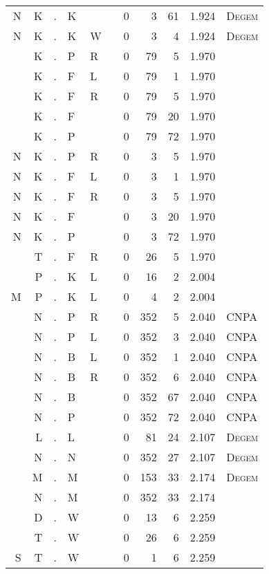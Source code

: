 \begin{longtable}{r@{ } r@{ } c@{ } l@{ } l@{ } l@{ } r r r r l }
N & K & . & K &   &   & 0 & 3 & 61 & 1.924 & \textsc{Degem} \\
N & K & . & K & W &   & 0 & 3 & 4 & 1.924 & \textsc{Degem} \\
  & K & . & P & R &   & 0 & 79 & 5 & 1.970 &  \\
  & K & . & F & L &   & 0 & 79 & 1 & 1.970 &  \\
  & K & . & F & R &   & 0 & 79 & 5 & 1.970 &  \\
  & K & . & F &   &   & 0 & 79 & 20 & 1.970 &  \\
  & K & . & P &   &   & 0 & 79 & 72 & 1.970 &  \\
N & K & . & P & R &   & 0 & 3 & 5 & 1.970 &  \\
N & K & . & F & L &   & 0 & 3 & 1 & 1.970 &  \\
N & K & . & F & R &   & 0 & 3 & 5 & 1.970 &  \\
N & K & . & F &   &   & 0 & 3 & 20 & 1.970 &  \\
N & K & . & P &   &   & 0 & 3 & 72 & 1.970 &  \\
  & T & . & F & R &   & 0 & 26 & 5 & 1.970 &  \\
  & P & . & K & L &   & 0 & 16 & 2 & 2.004 &  \\
M & P & . & K & L &   & 0 & 4 & 2 & 2.004 &  \\
  & N & . & P & R &   & 0 & 352 & 5 & 2.040 & \textsc{CNPA} \\
  & N & . & P & L &   & 0 & 352 & 3 & 2.040 & \textsc{CNPA} \\
  & N & . & B & L &   & 0 & 352 & 1 & 2.040 & \textsc{CNPA} \\
  & N & . & B & R &   & 0 & 352 & 6 & 2.040 & \textsc{CNPA} \\
  & N & . & B &   &   & 0 & 352 & 67 & 2.040 & \textsc{CNPA} \\
  & N & . & P &   &   & 0 & 352 & 72 & 2.040 & \textsc{CNPA} \\
  & L & . & L &   &   & 0 & 81 & 24 & 2.107 & \textsc{Degem} \\
  & N & . & N &   &   & 0 & 352 & 27 & 2.107 & \textsc{Degem} \\
  & M & . & M &   &   & 0 & 153 & 33 & 2.174 & \textsc{Degem} \\
  & N & . & M &   &   & 0 & 352 & 33 & 2.174 &  \\
  & D & . & W &   &   & 0 & 13 & 6 & 2.259 &  \\
  & T & . & W &   &   & 0 & 26 & 6 & 2.259 &  \\
S & T & . & W &   &   & 0 & 1 & 6 & 2.259 &  \\

\end{longtable}
